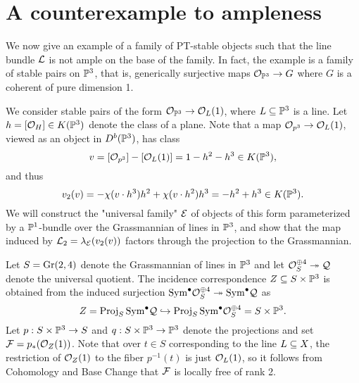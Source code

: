 \section{A counterexample to ampleness}\label{section:counterex}
We now give an example of a family of PT-stable objects such that the line bundle $\mathcal{L}$ is not ample on the base of the family. In fact, the example is a family of stable pairs on $\mathbb{P}^3$, that is, generically surjective maps $\mathcal{O}_{\mathbb{P}^3} \to G$ where $G$ is a coherent of pure dimension 1.
\begin{expl}
We consider stable pairs of the form $\mathcal{O}_{\mathbb{P}^3} \to \mathcal{O}_L(1)$, where $L \subseteq \mathbb{P}^3$ is a line. Let $h = [\mathcal{O}_H] \in K(\mathbb{P}^3)$ denote the class of a plane. Note that a map $\mathcal{O}_{p^3} \to \mathcal{O}_L(1)$, viewed as an object in $D^b(\mathbb{P}^3)$, has class
\[ v = [\mathcal{O}_{p^3}] - [\mathcal{O}_L(1)] = 1 - h^2 - h^3 \in K(\mathbb{P}^3), \]
and thus
\[ v_2(v) = - \chi(v \cdot h^3) h^2 + \chi(v \cdot h^2) h^3 = - h^2 + h^3 \in K(\mathbb{P}^3). \] 
We will construct the "universal family" $\mathcal{E}$ of objects of this form parameterized by a $\mathbb{P}^1$-bundle over the Grassmannian of lines in $\mathbb{P}^3$, and show that the map induced by $\mathcal{L}_2 = \lambda_{\mathcal{E}}(v_2(v))$ factors through the projection to the Grassmannian.

Let $S = \mathrm{Gr}(2,4)$ denote the Grassmannian of lines in $\mathbb{P}^3$ and let $\mathcal{O}_S^{\oplus 4} \twoheadrightarrow \mathcal{Q}$ denote the universal quotient. The incidence correspondence $Z \subseteq S \times \mathbb{P}^3$ is obtained from the induced surjection $\mathrm{Sym}^\bullet \mathcal{O}_S^{\oplus 4} \twoheadrightarrow \mathrm{Sym}^\bullet \mathcal{Q}$ as
\[ Z = \operatorname{\mathrm{Proj}}_S \mathrm{Sym}^\bullet \mathcal{Q} \hookrightarrow \operatorname{\mathrm{Proj}}_S \mathrm{Sym}^\bullet \mathcal{O}_S^{\oplus 4} = S \times \mathbb{P}^3. \]
Let $p: S \times \mathbb{P}^3 \to S$ and $q: S \times \mathbb{P}^3 \to \mathbb{P}^3$ denote the projections and set $\mathcal{F} = p_*(\mathcal{O}_Z(1))$. Note that over $t \in S$ corresponding to the line $L \subseteq X$, the restriction of $\mathcal{O}_Z(1)$ to the fiber $p^{-1}(t)$ is just $\mathcal{O}_L(1)$, so it follows from Cohomology and Base Change that $\mathcal{F}$ is locally free of rank 2. 


\end{expl}

